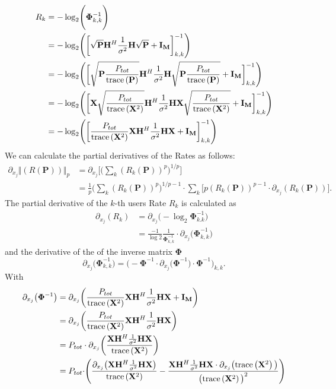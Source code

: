 \begin{align}
	R_k &= -\log_2\Biggr(\mathbf{\Phi}_{k,k}^{-1}\Biggl)\\
	&= -\log_2\Biggr(\biggr[ \sqrt{\mathbf{P}}\mathbf{H}^H\frac{1}{\sigma^2}\mathbf{H}\sqrt{\mathbf{P}} + \mathbf{I_M} \biggl]_{k,k}^{-1}\Biggl)\\
	&= -\log_2\Biggr(\biggr[ \sqrt{\mathbf{P} \frac{P_{tot}}{\text{trace}\left(\mathbf{P}\right)}}\mathbf{H}^H\frac{1}{\sigma^2}\mathbf{H} \sqrt{\mathbf{P} \frac{P_{tot}}{\text{trace}\left(\mathbf{P}\right)}} + \mathbf{I_M} \biggl]_{k,k}^{-1}\Biggl)\\
	&= -\log_2\Biggr(\biggr[ \mathbf{X} \sqrt{\frac{P_{tot}}{\text{trace}\left(\mathbf{X}^2\right)}} \mathbf{H}^H\frac{1}{\sigma^2}\mathbf{H} \mathbf{X} \sqrt{\frac{P_{tot}}{\text{trace}\left(\mathbf{X}^2\right)}} + \mathbf{I_M} \biggl]_{k,k}^{-1}\Biggl)\\
	&= -\log_2\Biggr(\biggr[\frac{P_{tot}}{\text{trace}\left(\mathbf{X}^2\right)} \mathbf{X}\mathbf{H}^H\frac{1}{\sigma^2}\mathbf{H} \mathbf{X} + \mathbf{I_M} \biggl]_{k,k}^{-1}\Biggl)
\end{align}
We can calculate the partial derivatives of the Rates as follows:
\begin{align}
	\partial_{x_j} \bigr\Vert{(R(\mathbf{P}))\bigl\Vert}_p
	&=\partial_{x_j}\Biggr[\Biggr(\sum_k{(R_k(\mathbf{P}))^p}\Biggl)^{1/p}\Biggl]\\
	&=\frac{1}{p}\Biggr(\sum_k{(R_k(\mathbf{P}))^p}\Biggl)^{1/p-1} \cdot \sum_k{\Biggr[p(R_k(\mathbf{P}))^{p-1} \cdot \partial_{x_j}(R_k(\mathbf{P}))\Biggl]}.
\end{align}
The partial derivative of the $k$-th users Rate $R_k$ is calculated as
\begin{align}
	\partial_{x_j}(R_k) &= \partial_{x_j}\bigr(-\log_2{\mathbf{\Phi}_{k.k}^{-1}}\bigl)\\
	&=\frac{-1}{\log{2}}\frac{1}{\mathbf{\Phi}_{k,k}^{-1}} \cdot \partial_{x_j}\bigr(\mathbf{\Phi}_{k,k}^{-1}\bigl)
\end{align}
and the derivative of the of the inverse matrix $\mathbf{\Phi}$
\begin{equation}
	\partial_{x_j}\bigr(\mathbf{\Phi}_{k,k}^{-1}\bigl) = \Biggr(-\mathbf{\Phi}^{-1} \cdot \partial_{x_j}\bigr(\mathbf{\Phi}^{-1}\bigl) \cdot \mathbf{\Phi}^{-1}\Biggl)_{k,k}.
\end{equation}
With
\begin{align}
	\partial_{x_j}\bigr(\mathbf{\Phi}^{-1}\bigl) &= \partial_{x_j} \biggr(\frac{P_{tot}}{\text{trace}\left(\mathbf{X}^2\right)} \mathbf{X}\mathbf{H}^H\frac{1}{\sigma^2}\mathbf{H} \mathbf{X} + \mathbf{I_M} \biggl)\\
	&= \partial_{x_j} \biggr(\frac{P_{tot}}{\text{trace}\left(\mathbf{X}^2\right)} \mathbf{X}\mathbf{H}^H\frac{1}{\sigma^2}\mathbf{H} \mathbf{X}\biggl)\\
	&= P_{tot} \cdot \partial_{x_j} \biggr(\frac{ \mathbf{X}\mathbf{H}^H\frac{1}{\sigma^2}\mathbf{H} \mathbf{X} }{\text{trace}\left(\mathbf{X}^2\right)}\biggl)\\
	&= P_{tot} \cdot \Biggr(\frac{\partial_{x_j}\bigr(\mathbf{X}\mathbf{H}^H\frac{1}{\sigma^2}\mathbf{H}\mathbf{X}\bigl)}{\text{trace}\left(\mathbf{X}^2\right)} - \frac{\mathbf{X}\mathbf{H}^H\frac{1}{\sigma^2}\mathbf{H}\mathbf{X} \cdot \partial_{x_j}\bigr(\text{trace}\left(\mathbf{X}^2\right)\bigl)}{\bigr(\text{trace}\left(\mathbf{X}^2\right)\bigl)^2}\Biggl)\\
\end{align}
